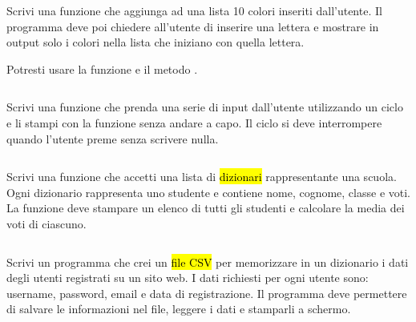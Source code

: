 \documentclass[a4paper,11pt,addpoints]{exam}
\begin{document}
\begin{questions}
    \questionspace

    \question[2]  Scrivi una funzione che aggiunga ad una lista \num{10} colori inseriti dall'utente.
    Il programma deve poi chiedere all'utente di inserire una lettera e mostrare in output solo
    i colori nella lista che iniziano con quella lettera.

    \begin{tips}
        \item Potresti usare la funzione  e il metodo .
    \end{tips}

    \begin{solution}
        \small\inputminted{python}{solution/019.py}
    \end{solution}

    \questionspace

    \question[3]  Scrivi una funzione che prenda una serie di input dall'utente utilizzando un ciclo
     e li stampi con la funzione  senza andare a capo.
    Il ciclo  si deve interrompere
    quando l'utente preme  senza scrivere nulla.

    \begin{solution}
        \small\inputminted{python}{solution/020.py}
    \end{solution}

    \questionspace

    \question[3]  Scrivi una funzione che accetti una lista di \hl{dizionari} rappresentante una scuola.
    Ogni dizionario rappresenta uno studente e contiene nome, cognome, classe e voti.
    La funzione deve stampare un elenco di tutti gli studenti e calcolare la media dei voti di ciascuno.

    \begin{solution}
        \small\inputminted{python}{solution/021.py}
    \end{solution}

    \questionspace

    \question[2]  Scrivi un programma che crei un \hl{file CSV} per memorizzare in un dizionario i dati
    degli utenti registrati su un sito web. I dati richiesti per ogni utente sono: username, password,
    email e data di registrazione. Il programma deve permettere di salvare le informazioni nel file,
    leggere i dati e stamparli a schermo.


\end{questions}
\end{document}

